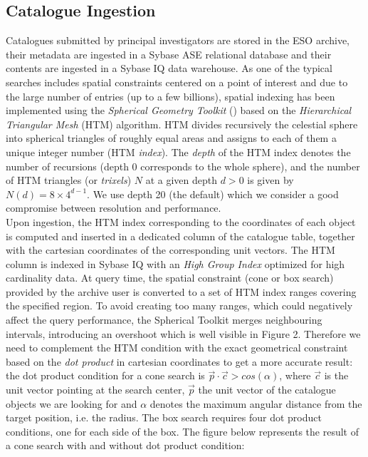 \documentclass[11pt,twoside]{article}
\begin{document}
\subsection{Catalogue Ingestion}
Catalogues submitted by principal investigators are stored in the ESO archive, their metadata are ingested in a Sybase ASE relational database and their contents are ingested in a Sybase IQ data warehouse. As one of the typical searches includes spatial constraints centered on a point of interest and due to the large number of entries (up to a few billions), spatial indexing has been implemented using the \textit{Spherical Geometry Toolkit} (\citet{spherical})
based on the \textit{Hierarchical Triangular Mesh} (HTM) algorithm. HTM divides recursively the celestial sphere into spherical triangles of roughly equal areas and assigns to each of them a unique integer number (HTM \textit{index}). The \textit{depth} of the HTM index denotes the number of recursions (depth 0 corresponds to the whole sphere), and the number of HTM triangles (or \textit{trixels}) $N$ at a given depth $d>0$ is given by $N(d) = 8\times{4^{d-1}}$. We use depth 20 (the default) which we consider a good compromise between resolution and performance.\\
Upon ingestion, the HTM index corresponding to the coordinates of each object is computed and inserted in a dedicated column of the catalogue table, together with the cartesian coordinates of the corresponding unit vectors. The HTM column is indexed in Sybase IQ with an \textit{High Group Index} optimized for high cardinality data. At query time, the spatial constraint (cone or box search) provided by the archive user is converted to a set of HTM index ranges covering the specified region. To avoid creating too many ranges, which could negatively affect the query performance, the Spherical Toolkit merges neighbouring intervals, introducing an overshoot which is well visible in Figure 2. Therefore we need to complement the HTM condition with the exact geometrical constraint based on the \textit{dot product} in cartesian coordinates to get a more accurate result: the dot product condition for a cone search is $\vec{p}\cdot\vec{c}>cos(\alpha)$, where $\vec{c}$ is the unit vector pointing at the search center, $\vec{p}$ the unit vector of the catalogue objects we are looking for and $\alpha$ denotes the maximum angular distance from the target position, i.e. the radius. The box search requires four dot product conditions, one for each side of the box. The figure below represents the result of a cone search with and without dot product condition:\\
\end{document}
